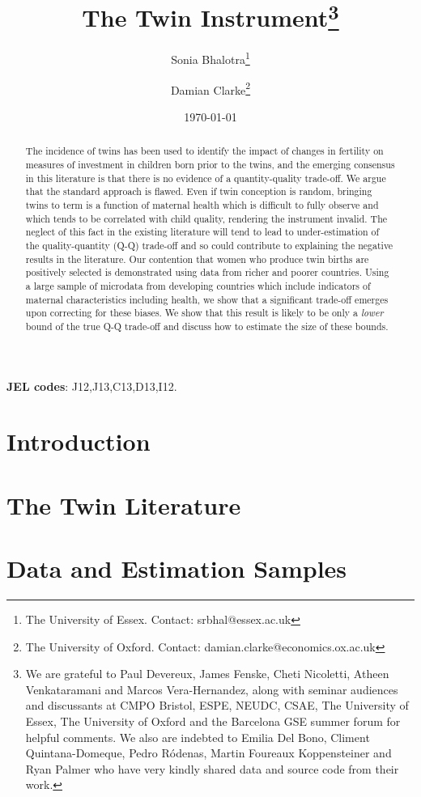 \documentclass{article}[11pt,subeqn]
\title{The Twin Instrument\footnote{We are grateful to Paul Devereux, 
James Fenske, Cheti Nicoletti, Atheen Venkataramani and Marcos Vera-Hernandez, 
along with seminar audiences and discussants at CMPO Bristol, ESPE, NEUDC, CSAE, 
The University of Essex, The University of Oxford and the Barcelona GSE summer 
forum for helpful comments.  We also are indebted to Emilia Del Bono, Climent 
Quintana-Domeque, Pedro R\'odenas, Martin Foureaux Koppensteiner and Ryan Palmer 
who have very kindly shared data and source code from their work.}}
\author{Sonia Bhalotra\thanks{The University of Essex.  
Contact: srbhal@essex.ac.uk} 
\and Damian Clarke\thanks{The University of Oxford. 
Contact: damian.clarke@economics.ox.ac.uk}}
\date{\today}
\begin{document}
\begin{spacing}{1.4}

\maketitle
\begin{abstract}
 The incidence of twins has been used to identify the impact of changes in 
 fertility on measures of investment in children born prior to the twins, and
 the emerging consensus in this literature is that there is no evidence of a
 quantity-quality trade-off. We argue that the standard approach is flawed.
 Even if twin conception is random, bringing twins to term is a function of
 maternal health which is difficult to fully observe and which tends to be
 correlated with child quality, rendering the instrument invalid. The neglect
 of this fact in the existing literature will tend to lead to
 under-estimation of the quality-quantity (Q-Q) trade-off and so could
 contribute to explaining the negative results in the literature. Our contention
 that women who produce twin births are positively selected is demonstrated using
 data from richer and poorer countries. Using a large sample of microdata from
 developing countries which include indicators of maternal characteristics
 including health, we show that a significant trade-off emerges upon correcting
 for these biases. We show that this result is likely to be only a \emph{lower}
 bound of the true Q-Q trade-off and discuss how to estimate the size of these
 bounds.
 \\
\end{abstract}
\hspace{4mm}\textbf{\small JEL codes}: J12,J13,C13,D13,I12. \\

\newpage
\section{Introduction}                             \label{TWINscn:intro}
\section{The Twin Literature}                      \label{TWINscn:literature}
\section{Data and Estimation Samples}              \label{TWINscn:data}

\end{spacing}
\end{document}

